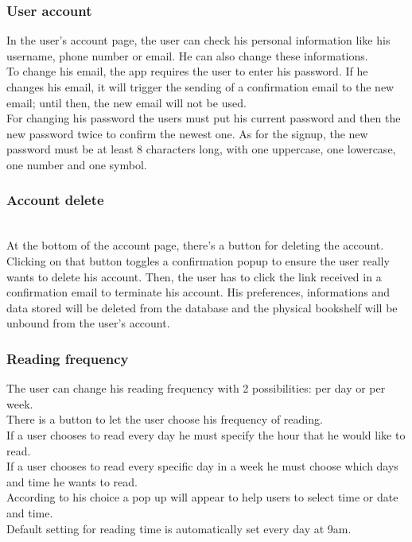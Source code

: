 \documentclass[conference]{IEEEtran}
\begin{document}
\subsubsection{User account}

In the user’s account page, the user can check his personal information like his username, phone number or email. He can also change these informations.\\
To change his email, the app requires the user to enter his password. If he changes his email, it will trigger the sending of a confirmation email to the new email; until then, the new email will not be used.\\
For changing his password the users must put his current password and then the new password twice to confirm the newest one. As for the signup, the new password must be  at least 8 characters long, with one uppercase, one lowercase, one number and one symbol.\\

\subsubsection{Account delete}\hfill\\
At the bottom of the account page, there's a button for deleting the account. Clicking on that button toggles a confirmation popup to ensure the user really wants to delete his account. Then, the user has to click the link received in a confirmation email to terminate his account. His preferences, informations and data stored will be deleted from the database and the physical bookshelf will be unbound from the user's account.\\

\subsubsection{Reading frequency}\hfill

The user can change his reading frequency with 2 possibilities: per day or per week.\\
There is a button to let the user choose his frequency of reading.\\
If a user chooses to read every day he must specify the hour that he would like to read.\\
If a user chooses to read every specific day in a week he must choose which days and time he wants to read.\\
According to his choice a pop up will appear to help users to select time or date and time.\\
Default setting for reading time is automatically set every day at 9am.\\
\end{document}
